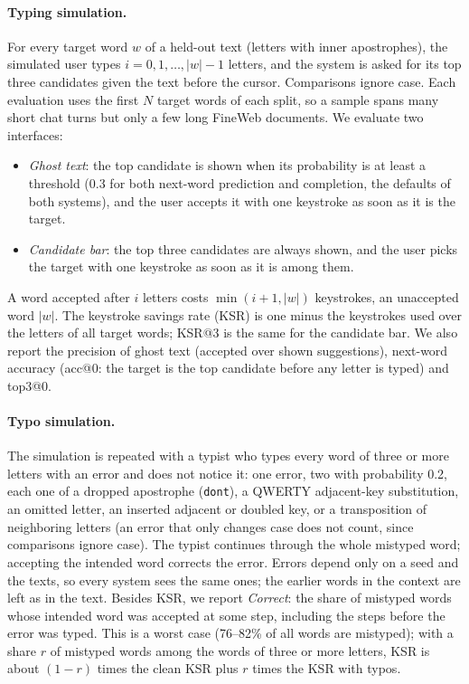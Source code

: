 \documentclass[11pt]{article}
\begin{document}
\paragraph{Typing simulation.} For every target word $w$ of a held-out text (letters with inner apostrophes), the
simulated user types $i = 0, 1, \dots, |w|-1$ letters, and the system is asked for its top three candidates given
the text before the cursor. Comparisons ignore case. Each evaluation uses the first $N$ target words of each split,
so a sample spans many short chat turns but only a few long FineWeb documents. We evaluate two interfaces:
\begin{itemize}
  \item \emph{Ghost text}: the top candidate is shown when its probability is at least a threshold (0.3 for both
  next-word prediction and completion, the defaults of both systems), and the user accepts it with one keystroke as
  soon as it is the target.
  \item \emph{Candidate bar}: the top three candidates are always shown, and the user picks the target with one
  keystroke as soon as it is among them.
\end{itemize}
A word accepted after $i$ letters costs $\min(i+1, |w|)$ keystrokes, an unaccepted word $|w|$. The keystroke savings
rate (KSR) is one minus the keystrokes used over the letters of all target words; KSR@3 is the same for the
candidate bar. We also report the precision of ghost text (accepted over shown suggestions), next-word accuracy
(acc@0: the target is the top candidate before any letter is typed) and top3@0.

\paragraph{Typo simulation.} The simulation is repeated with a typist who types every word of three or more letters
with an error and does not notice it: one error, two with probability 0.2, each one of a dropped apostrophe
(\texttt{dont}), a QWERTY adjacent-key substitution, an omitted letter, an inserted adjacent or doubled key, or a
transposition of neighboring letters (an error that only changes case does not count, since comparisons ignore case).
The typist continues through the whole mistyped word; accepting the intended word corrects the error. Errors depend
only on a seed and the texts, so every system sees the same ones; the earlier words in the context are left as in
the text. Besides KSR, we report \emph{Correct}: the share of mistyped words whose intended word was accepted at some
step, including the steps before the error was typed. This is a worst case (76--82\% of all words are mistyped); with
a share $r$ of mistyped words among the words of three or more letters, KSR is about $(1-r)$ times the clean KSR plus $r$ times the KSR with typos.
\end{document}
